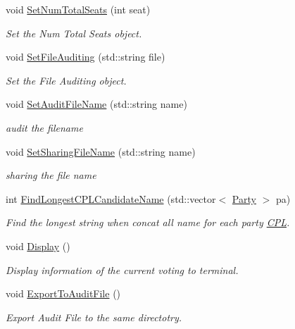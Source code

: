 \begin{DoxyCompactItemize}
void \hyperlink{classReport_a395c9d4a03d8ac9d6476e8bac95e829a}{Set\+Num\+Total\+Seats} (int seat)
\begin{DoxyCompactList}\small\item\em Set the Num Total Seats object. \end{DoxyCompactList}\item 
void \hyperlink{classReport_a23043c84ac408fe6ec2bc03d1dc0b700}{Set\+File\+Auditing} (std\+::string file)
\begin{DoxyCompactList}\small\item\em Set the File Auditing object. \end{DoxyCompactList}\item 
void \hyperlink{classReport_ac860bc2e03f18c6787c92680cf48e944}{Set\+Audit\+File\+Name} (std\+::string name)
\begin{DoxyCompactList}\small\item\em audit the filename \end{DoxyCompactList}\item 
void \hyperlink{classReport_ade621e193bc103820ca18830295934a9}{Set\+Sharing\+File\+Name} (std\+::string name)
\begin{DoxyCompactList}\small\item\em sharing the file name \end{DoxyCompactList}\item 
int \hyperlink{classReport_a077538dbc2a1953af4d9cb39502d8749}{Find\+Longest\+C\+P\+L\+Candidate\+Name} (std\+::vector$<$ \hyperlink{classParty}{Party} $>$ pa)
\begin{DoxyCompactList}\small\item\em Find the longest string when concat all name for each party \hyperlink{classCPL}{C\+PL}. \end{DoxyCompactList}\item 
\mbox{\label{classReport_a304b0161066ec48b1ec55fdde420cf81}} 
void \hyperlink{classReport_a304b0161066ec48b1ec55fdde420cf81}{Display} ()
\begin{DoxyCompactList}\small\item\em Display information of the current voting to terminal. \end{DoxyCompactList}\item 
\mbox{\label{classReport_a6d978116196301a30391e836da93b9c0}} 
void \hyperlink{classReport_a6d978116196301a30391e836da93b9c0}{Export\+To\+Audit\+File} ()
\begin{DoxyCompactList}\small\item\em Export Audit File to the same directotry. \end{DoxyCompactList}\item 

\end{DoxyCompactItemize}
